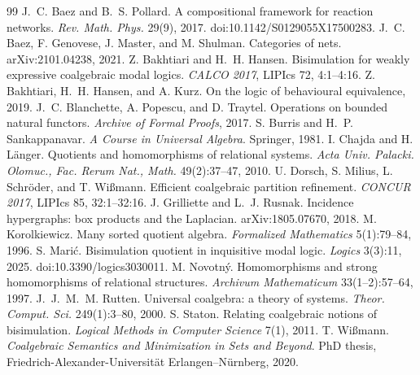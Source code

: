 \documentclass[11pt]{article}
\theoremstyle{definition}
\begin{document}
\begin{thebibliography}{99}
 J.~C. Baez and B.~S. Pollard.
  A compositional framework for reaction networks.
  \emph{Rev. Math. Phys.} 29(9), 2017. doi:10.1142/S0129055X17500283.
 J.~C. Baez, F. Genovese, J. Master, and M. Shulman.
  Categories of nets. arXiv:2101.04238, 2021.
 Z. Bakhtiari and H.~H. Hansen.
  Bisimulation for weakly expressive coalgebraic modal logics.
  \emph{CALCO 2017}, LIPIcs 72, 4:1--4:16.
 Z. Bakhtiari, H.~H. Hansen, and A. Kurz.
  On the logic of behavioural equivalence, 2019.
 J.~C. Blanchette, A. Popescu, and D. Traytel.
  Operations on bounded natural functors.
  \emph{Archive of Formal Proofs}, 2017.
 S. Burris and H.~P. Sankappanavar.
  \emph{A Course in Universal Algebra}. Springer, 1981.
 I. Chajda and H. L\"anger.
  Quotients and homomorphisms of relational systems.
  \emph{Acta Univ. Palacki. Olomuc., Fac. Rerum Nat., Math.} 49(2):37--47, 2010.
 U. Dorsch, S. Milius, L. Schr\"oder, and T. Wi{\ss}mann.
  Efficient coalgebraic partition refinement.
  \emph{CONCUR 2017}, LIPIcs 85, 32:1--32:16.
 J. Grilliette and L.~J. Rusnak.
  Incidence hypergraphs: box products and the Laplacian.
  arXiv:1805.07670, 2018.
 M. Korolkiewicz.
  Many sorted quotient algebra.
  \emph{Formalized Mathematics} 5(1):79--84, 1996.
 S. Mari\'c.
  Bisimulation quotient in inquisitive modal logic.
  \emph{Logics} 3(3):11, 2025. doi:10.3390/logics3030011.
 M. Novotn\'y.
  Homomorphisms and strong homomorphisms of relational structures.
  \emph{Archivum Mathematicum} 33(1--2):57--64, 1997.
 J.~J.~M.~M. Rutten.
  Universal coalgebra: a theory of systems.
  \emph{Theor. Comput. Sci.} 249(1):3--80, 2000.
 S. Staton.
  Relating coalgebraic notions of bisimulation.
  \emph{Logical Methods in Computer Science} 7(1), 2011.
 T. Wi{\ss}mann.
  \emph{Coalgebraic Semantics and Minimization in Sets and Beyond}.
  PhD thesis, Friedrich-Alexander-Universit\"at Erlangen--N\"urnberg, 2020.
\end{thebibliography}
\end{document}
